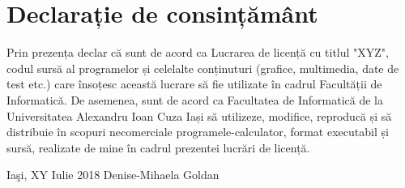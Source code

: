 \chapter*{\large {Declarație de consințământ}}

Prin prezența declar că sunt de acord ca Lucrarea de licență cu titlul "XYZ", codul sursă al programelor și celelalte conținuturi  (grafice, multimedia, date de test etc.) care însoțesc această lucrare să fie utilizate în cadrul Facultății de Informatică. 
De asemenea, sunt de acord ca Facultatea de Informatică de la Universitatea Alexandru Ioan Cuza Iași să utilizeze, modifice, reproducă și să distribuie în scopuri necomerciale programele-calculator, format executabil și sursă, realizate de mine în cadrul prezentei lucrări de licență. 

\hfill \break
\hfill \break

Iaşi, XY Iulie 2018 \hfill Denise-Mihaela Goldan\\

\clearpage